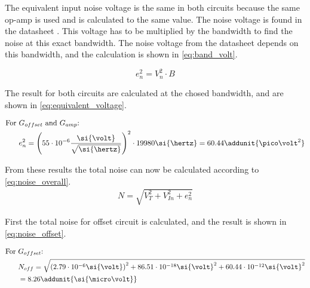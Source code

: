 The equivalent input noise voltage is the same in both circuits because the same op-amp is used and is calculated to the same value. The noise voltage is found in the datasheet \citep{tle2072ac}. This voltage has to be multiplied by the bandwidth to find the noise at this exact bandwidth. The noise voltage from the datasheet depends on this bandwidth, and the calculation is shown in \autoref{eq:band_volt}.

\begin{equation}
	e_{n}^2 = V_n ^2 \cdot B
	\label{eq:band_volt}
\end{equation}

\startexplain
\stopexplain

The result for both circuits are calculated at the chosed bandwidth, and are shown in \autoref{eq:equivalent_voltage}.

\begin{align}\label{eq:equivalent_voltage}
	\text{For } &G_{offset} \text{ and } G_{amp}\text{: } \nonumber \\
	&e_{n}^2 = \left( 55 \cdot 10^{-6}\frac{\si{\volt}}{\sqrt{\si{\hertz}}} \right) ^2 \cdot 19980 \si{\hertz} = 60.44
	\addunit{\pico\volt^2}
\end{align}

From these results the total noise can now be calculated according to \autoref{eq:noise_overall}.
\begin{align}\label{eq:noise_overall}
	N = \sqrt{V_T^2+V_{In}^2+e_n^2}
\end{align}

\startexplain
\stopexplain

First the total noise for offset circuit is calculated, and the result is shown in \autoref{eq:noise_offset}.

\begin{align}
\text{For } &G_{offset}\text{: } \nonumber \\
	&N_{off} = \sqrt{\left( 2.79 \cdot 10^{-6} \si{\volt} \right) ^2+ 86.51  \cdot 10^{-18}\si{\volt}^2 + 60.44 \cdot 10^{-12}\si{\volt}^2} \nonumber \\
	& = 8.26 \label{eq:noise_offset}
	\addunit{\si{\micro\volt}}
\end{align}

